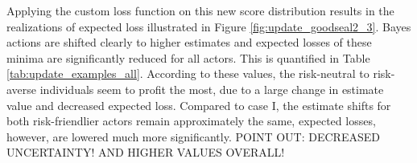 				Applying the custom loss function on this new score distribution results in the realizations of expected loss illustrated in Figure \ref{fig:update_goodseal2_3}. Bayes actions are shifted clearly to higher estimates and expected losses of these minima are significantly reduced for all actors. This is quantified in Table \ref{tab:update_examples_all}. According to these values, the risk-neutral to risk-averse individuals seem to profit the most, due to a large change in estimate value and decreased expected loss. Compared to case I, the estimate shifts for both risk-friendlier actors remain approximately the same, expected losses, however, are lowered much more significantly.
				POINT OUT: DECREASED UNCERTAINTY! AND HIGHER VALUES OVERALL!\\		
				
